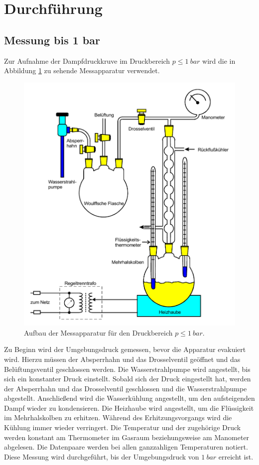 \section{Durchführung}
\label{sec:Durchführung}

\subsection{Messung bis 1 bar}

Zur Aufnahme der Dampfdruckkruve im Druckbereich  $p \leq \qty{1}{bar}$ wird die 
in Abbildung \ref{fig:tiefdruck} zu sehende Messapparatur verwendet. 
\begin{figure} [H]
    \centering
    \includegraphics[width=12cm] {pictures/tiefdruck.pdf} 
    \caption{Aufbau der Messapparatur für den Druckbereich $p \leq \qty{1}{bar}$. \cite[6]{v203}}
    \label{fig:tiefdruck}
\end{figure} 

Zu Beginn wird der Umgebungsdruck gemessen, bevor die Apparatur evakuiert wird.
Hierzu müssen der Absperrhahn und das Drosselventil geöffnet und das Belüftungsventil geschlossen werden.
Die Wasserstrahlpumpe wird angestellt, bis sich ein konstanter Druck einstellt. 
Sobald sich der Druck eingestellt hat, 
werden der Absperrhahn und das Drosselventil geschlossen und die Wasserstrahlpumpe abgestellt.
Anschließend wird die Wasserkühlung angestellt, um den aufsteigenden Dampf wieder zu kondensieren. 
Die Heizhaube wird angestellt, um die Flüssigkeit im Mehrhalskolben zu erhitzen. 
Während des Erhitzungsvorgangs wird die Kühlung immer wieder verringert. 
Die Temperatur und der zugehörige Druck werden konstant am Thermometer im Gasraum beziehungsweise am Manometer abgelesen. 
Die Datenpaare werden bei allen ganzzahligen Temperaturen notiert. 
Diese Messung wird durchgeführt, bis der Umgebungsdruck von $\qty{1}{bar}$ erreicht ist.


